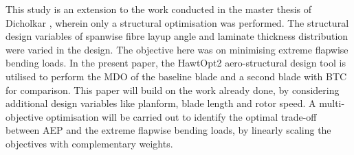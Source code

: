 \documentclass[a4paper]{jpconf}
\begin{document}
This study is an extension to the work conducted in the master thesis of Dicholkar \cite{dicholkar2017numerical}, wherein only a structural optimisation was performed. The structural design variables of spanwise fibre layup angle and laminate thickness distribution were varied in the design. The objective here was on minimising extreme flapwise bending loads. In the present paper, the HawtOpt2 \cite{zahle2016design} aero-structural design tool is utilised to perform the MDO of the baseline blade and a second blade with BTC for comparison. This paper will build on the work already done, by considering additional design variables like planform, blade length and rotor speed. A multi-objective optimisation will be carried out to identify the optimal trade-off between AEP and the extreme flapwise bending loads, by linearly scaling the objectives with complementary weights. 


\end{document}
